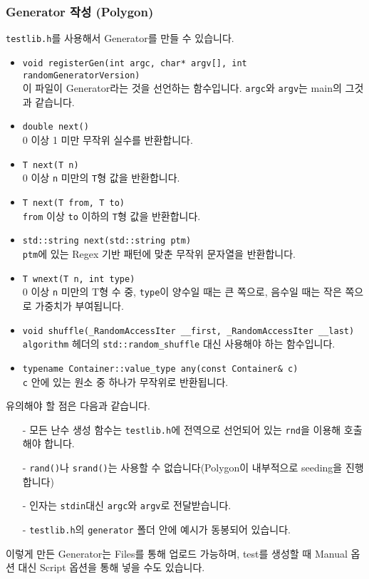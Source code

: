 \documentclass{article}
\begin{document}
    \subsubsection{Generator 작성 (Polygon)}
    \verb|testlib.h|를 사용해서 Generator를 만들 수 있습니다. 
    \begin{itemize}
        \item \verb|void registerGen(int argc, char* argv[], int randomGeneratorVersion)|\\
        이 파일이 Generator라는 것을 선언하는 함수입니다. \verb|argc|와 \verb|argv|는 main의 그것과 같습니다.
        \item \verb|double next()|\\
        0 이상 1 미만 무작위 실수를 반환합니다.
        \item \verb|T next(T n)|\\
        0 이상 \verb|n| 미만의 \verb|T|형 값을 반환합니다.
        \item \verb|T next(T from, T to)|\\
        \verb|from| 이상 \verb|to| 이하의 \verb|T|형 값을 반환합니다.
        \item \verb|std::string next(std::string ptm)|\\
        \verb|ptm|에 있는 Regex 기반 패턴에 맞춘 무작위 문자열을 반환합니다.
        \item \verb|T wnext(T n, int type)|\\
        0 이상 \verb|n| 미만의 T형 수 중, \verb|type|이 양수일 때는 큰 쪽으로, 음수일 때는 작은 쪽으로 가중치가 부여됩니다.
        \item \verb|void shuffle(_RandomAccessIter __first, _RandomAccessIter __last)|\\
        \verb|algorithm| 헤더의 \verb|std::random_shuffle| 대신 사용해야 하는 함수입니다.
        \item \verb|typename Container::value_type any(const Container& c)|\\
        \verb|c| 안에 있는 원소 중 하나가 무작위로 반환됩니다.
    \end{itemize}
    유의해야 할 점은 다음과 같습니다.
    \begin{itemize}
        \item[-] 모든 난수 생성 함수는 \verb|testlib.h|에 전역으로 선언되어 있는 \verb|rnd|을 이용해 호출해야 합니다.
        \item[-] \verb|rand()|나 \verb|srand()|는 사용할 수 없습니다(Polygon이 내부적으로 seeding을 진행합니다)
        \item[-] 인자는 \verb|stdin|대신 \verb|argc|와 \verb|argv|로 전달받습니다.
        \item[-] \verb|testlib.h|의 \verb|generator| 폴더 안에 예시가 동봉되어 있습니다.
    \end{itemize}
    이렇게 만든 Generator는 Files를 통해 업로드 가능하며, test를 생성할 때 Manual 옵션 대신 Script 옵션을 통해 넣을 수도 있습니다.
\end{document}
